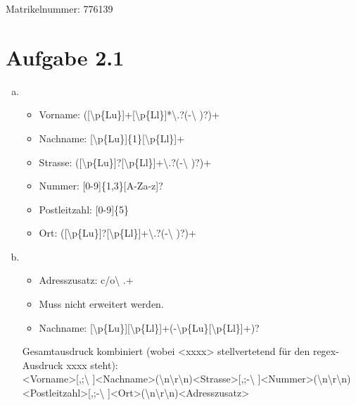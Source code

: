 \documentclass{article}
\begin{document}
Matrikelnummer: 776139
\\
\section{Aufgabe 2.1}
\begin{enumerate}[a)]
	\item
	\begin{itemize}
		\item
		Vorname: ([\textbackslash{}p\{Lu\}]+[\textbackslash{}p\{Ll\}]*\textbackslash{}.?(-\textbar{}\textbackslash{} )?)+\\
		\item
		Nachname: [\textbackslash{}p\{Lu\}]\{1\}[\textbackslash{}p\{Ll\}]+
		\item
		Strasse: ([\textbackslash{}p\{Lu\}]?[\textbackslash{}p\{Ll\}]+\textbackslash{}.?(-\textbar{}\textbackslash{} )?)+\\
		\item
		Nummer: [0-9]\{1,3\}[A-Za-z]?\\
		\item
		Postleitzahl: [0-9]\{5\}
		\item
		Ort: ([\textbackslash{}p\{Lu\}]?[\textbackslash{}p\{Ll\}]+\textbackslash{}.?(-\textbar{}\textbackslash{} )?)+
	\end{itemize}
	\item
	\begin{itemize}
		\item
		Adresszusatz: c/o\textbackslash{} .+
		\item
		Muss nicht erweitert werden.
		\item
		Nachname: [\textbackslash{}p\{Lu\}][\textbackslash{}p\{Ll\}]+(-\textbackslash{}p\{Lu\}[\textbackslash{}p\{Ll\}]+)?
	\end{itemize}
	Gesamtausdruck kombiniert (wobei \textless{}xxxx\textgreater{} stellvertetend f\"ur den regex-Ausdruck xxxx steht):\\
	\textless{}Vorname\textgreater{}[,;\textbackslash{} ]\textless{}Nachname\textgreater{}(\textbackslash{}n\textbar{}\textbackslash{}r\textbackslash{}n)\textless{}Strasse\textgreater{}[,;-\textbackslash{} ]\textless{}Nummer\textgreater{}(\textbackslash{}n\textbar{}\textbackslash{}r\textbackslash{}n)\textless{}Postleitzahl\textgreater{}[,;-\textbackslash{} ]\textless{}Ort\textgreater{}(\textbackslash{}n\textbar{}\textbackslash{}r\textbackslash{}n)\textless{}Adresszusatz\textgreater{}\\
	\\
\end{enumerate}
\end{document}
